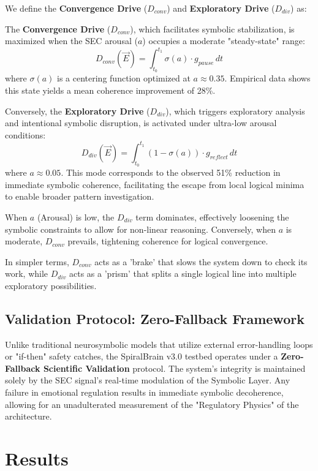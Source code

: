 \documentclass[11pt]{article}
\begin{document}
We define the \textbf{Convergence Drive} ($D_{conv}$) and \textbf{Exploratory Drive} ($D_{div}$) as:

The \textbf{Convergence Drive} ($D_{conv}$), which facilitates symbolic stabilization, is maximized when the SEC arousal ($a$) occupies a moderate "steady-state" range:
\begin{equation}
D_{conv}(\vec{E}) = \int_{t_0}^{t_1} \sigma(a) \cdot g_{pause} \, dt
\end{equation}
where $\sigma(a)$ is a centering function optimized at $a \approx 0.35$. Empirical data shows this state yields a mean coherence improvement of 28\%.

Conversely, the \textbf{Exploratory Drive} ($D_{div}$), which triggers exploratory analysis and intentional symbolic disruption, is activated under ultra-low arousal conditions:
\begin{equation}
D_{div}(\vec{E}) = \int_{t_0}^{t_1} (1 - \sigma(a)) \cdot g_{reflect} \, dt
\end{equation}
where $a \approx 0.05$. This mode corresponds to the observed 51\% reduction in immediate symbolic coherence, facilitating the escape from local logical minima to enable broader pattern investigation.

When $a$ (Arousal) is low, the $D_{div}$ term dominates, effectively loosening the symbolic constraints to allow for non-linear reasoning. Conversely, when $a$ is moderate, $D_{conv}$ prevails, tightening coherence for logical convergence.

In simpler terms, $D_{conv}$ acts as a 'brake' that slows the system down to check its work, while $D_{div}$ acts as a 'prism' that splits a single logical line into multiple exploratory possibilities.

\subsection{Validation Protocol: Zero-Fallback Framework}
Unlike traditional neurosymbolic models that utilize external error-handling loops or "if-then" safety catches, the SpiralBrain v3.0 testbed operates under a \textbf{Zero-Fallback Scientific Validation} protocol. The system's integrity is maintained solely by the SEC signal's real-time modulation of the Symbolic Layer. Any failure in emotional regulation results in immediate symbolic decoherence, allowing for an unadulterated measurement of the "Regulatory Physics" of the architecture.

\section{Results}
\end{document}
